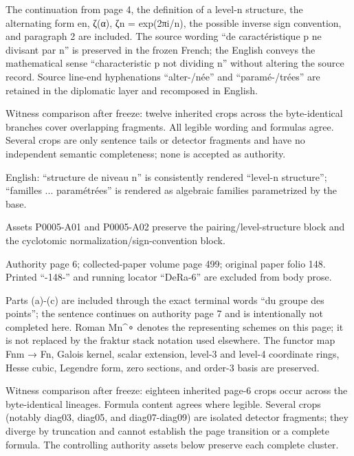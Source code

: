 \documentclass[11pt,a4paper]{article}
\begin{document}
The continuation from page 4, the definition of a level-n structure, the alternating form e\textunderscore{}n, ζ(α), ζ\textunderscore{}n = exp(2πi/n), the possible inverse sign convention, and paragraph 2 are included. The source wording “de caractéristique p ne divisant par n” is preserved in the frozen French; the English conveys the mathematical sense “characteristic p not dividing n” without altering the source record. Source line-end hyphenations “alter-/née” and “paramé-/trées” are retained in the diplomatic layer and recomposed in English.

Witness comparison after freeze: twelve inherited crops across the byte-identical branches cover overlapping fragments. All legible wording and formulas agree. Several crops are only sentence tails or detector fragments and have no independent semantic completeness; none is accepted as authority.

English: “structure de niveau n” is consistently rendered “level-n structure”; “familles ... paramétrées” is rendered as algebraic families parametrized by the base.

Assets P0005-A01 and P0005-A02 preserve the pairing/level-structure block and the cyclotomic normalization/sign-convention block.


\par\medskip
\hypertarget{D018-P0006}{}
\par\smallskip
Authority page 6; collected-paper volume page 499; original paper folio 148. Printed “-148-” and running locator “DeRa-6” are excluded from body prose.

Parts (a)-(c) are included through the exact terminal words “du groupe des points”; the sentence continues on authority page 7 and is intentionally not completed here. Roman M\textunderscore{}n\textasciicircum{}∘ denotes the representing schemes on this page; it is not replaced by the fraktur stack notation used elsewhere. The functor map F\textunderscore{}nm → F\textunderscore{}n, Galois kernel, scalar extension, level-3 and level-4 coordinate rings, Hesse cubic, Legendre form, zero sections, and order-3 basis are preserved.

Witness comparison after freeze: eighteen inherited page-6 crops occur across the byte-identical lineages. Formula content agrees where legible. Several crops (notably diag03, diag05, and diag07-diag09) are isolated detector fragments; they diverge by truncation and cannot establish the page transition or a complete formula. The controlling authority assets below preserve each complete cluster.
\end{document}
